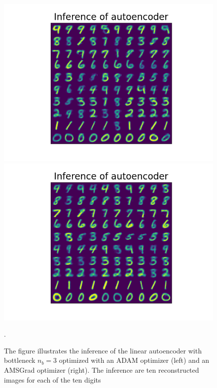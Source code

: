 \begin{figure}
\begin{center}
   \begin{minipage}[b]{0.49\linewidth}
      \includegraphics[width=\linewidth]{linear_AE_3d_adam_inference}
	\end{minipage}
   \begin{minipage}[b]{0.49\linewidth}
      \includegraphics[width=\linewidth]{linear_AE_3d_amsgrad_inference}
	\end{minipage}
\end{center}
\caption{The figure illustrates the inference of the linear autoencoder with bottleneck $n_b=3$ optimized with an ADAM optimizer (left) and an AMSGrad optimizer (right). The inference are ten reconstructed images for each of the ten digits}.\label{fig:linear_AE_3d_inference}
\end{figure}


